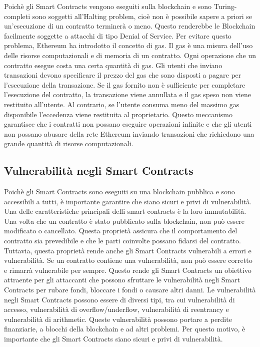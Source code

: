 \documentclass[../../Thesis.tex]{subfiles}
\begin{document}
Poichè gli Smart Contracts vengono eseguiti sulla blockchain e sono Turing-completi sono soggetti all'Halting problem, cioè non è possibile sapere a priori se un'esecuzione di un contratto terminerà o meno. Questo renderebbe le Blockchain facilmente soggette a attacchi di tipo Denial of Service. Per evitare questo problema, Ethereum ha introdotto il concetto di gas. Il gas è una misura dell'uso delle risorse computazionali e di memoria di un contratto. Ogni operazione che un contratto esegue costa una certa quantità di gas. Gli utenti che inviano transazioni devono specificare il prezzo del gas che sono disposti a pagare per l'esecuzione della transazione. Se il gas fornito non è sufficiente per completare l'esecuzione del contratto, la transazione viene annullata e il gas speso non viene restituito all'utente. Al contrario, se l'utente consuma meno del massimo gas disponibile l'eccedenza viene restituita al proprietario. Questo meccanismo garantisce che i contratti non possano eseguire operazioni infinite e che gli utenti non possano abusare della rete Ethereum inviando transazioni che richiedono una grande quantità di risorse computazionali.

\subsection{Vulnerabilità negli Smart Contracts}
Poichè gli Smart Contracts sono eseguiti su una blockchain pubblica e sono accessibili a tutti, è importante garantire che siano sicuri e privi di vulnerabilità. Una delle caratteristiche principali delli smart contracts è la loro immutabilità. Una volta che un contratto è stato pubblicato sulla blockchain, non può essere modificato o cancellato. Questa proprietà assicura che il comportamento del contratto sia prevedibile e che le parti coinvolte possano fidarsi del contratto. Tuttavia, questa proprietà rende anche gli Smart Contracts vulnerabili a errori e vulnerabilità. Se un contratto contiene una vulnerabilità, non può essere corretto e rimarrà vulnerabile per sempre. Questo rende gli Smart Contracts un obiettivo attraente per gli attaccanti che possono sfruttare le vulnerabilità negli Smart Contracts per rubare fondi, bloccare i fondi o causare altri danni. Le vulnerabilità negli Smart Contracts possono essere di diversi tipi, tra cui vulnerabilità di accesso, vulnerabilità di overflow/underflow, vulnerabilità di reentrancy e vulnerabilità di arithmetic. Queste vulnerabilità possono portare a perdite finanziarie, a blocchi della blockchain e ad altri problemi. Per questo motivo, è importante che gli Smart Contracts siano sicuri e privi di vulnerabilità.
\end{document}
